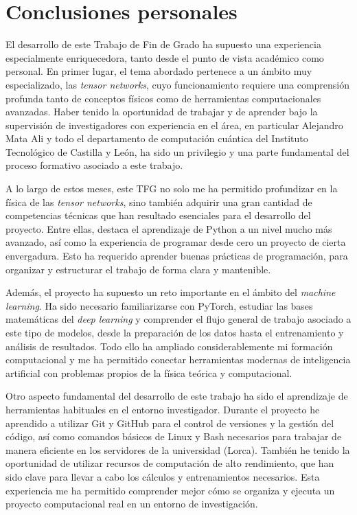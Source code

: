 \section{Conclusiones personales}

El desarrollo de este Trabajo de Fin de Grado ha supuesto una experiencia especialmente enriquecedora, tanto desde el punto de vista académico como personal. En primer lugar, el tema abordado pertenece a un ámbito muy especializado, las \textit{tensor networks}, cuyo funcionamiento requiere una comprensión profunda tanto de conceptos físicos como de herramientas computacionales avanzadas. Haber tenido la oportunidad de trabajar y de aprender bajo la supervisión de investigadores con experiencia en el área, en particular Alejandro Mata Ali y todo el departamento de computación cuántica del Instituto Tecnológico de Castilla y León, ha sido un privilegio y una parte fundamental del proceso formativo asociado a este trabajo.

A lo largo de estos meses, este TFG no solo me ha permitido profundizar en la física de las \textit{tensor networks}, sino también adquirir una gran cantidad de competencias técnicas que han resultado esenciales para el desarrollo del proyecto. Entre ellas, destaca el aprendizaje de Python a un nivel mucho más avanzado, así como la experiencia de programar desde cero un proyecto de cierta envergadura. Esto ha requerido aprender buenas prácticas de programación, para organizar y estructurar el trabajo de forma clara y mantenible.

Además, el proyecto ha supuesto un reto importante en el ámbito del \textit{machine learning}. Ha sido necesario familiarizarse con PyTorch, estudiar las bases matemáticas del \textit{deep learning} y comprender el flujo general de trabajo asociado a este tipo de modelos, desde la preparación de los datos hasta el entrenamiento y análisis de resultados. Todo ello ha ampliado considerablemente mi formación computacional y me ha permitido conectar herramientas modernas de inteligencia artificial con problemas propios de la física teórica y computacional.

Otro aspecto fundamental del desarrollo de este trabajo ha sido el aprendizaje de herramientas habituales en el entorno investigador. Durante el proyecto he aprendido a utilizar Git y GitHub para el control de versiones y la gestión del código, así como comandos básicos de Linux y Bash necesarios para trabajar de manera eficiente en los servidores de la universidad (Lorca). También he tenido la oportunidad de utilizar recursos de computación de alto rendimiento, que han sido clave para llevar a cabo los cálculos y entrenamientos necesarios. Esta experiencia me ha permitido comprender mejor cómo se organiza y ejecuta un proyecto computacional real en un entorno de investigación.

